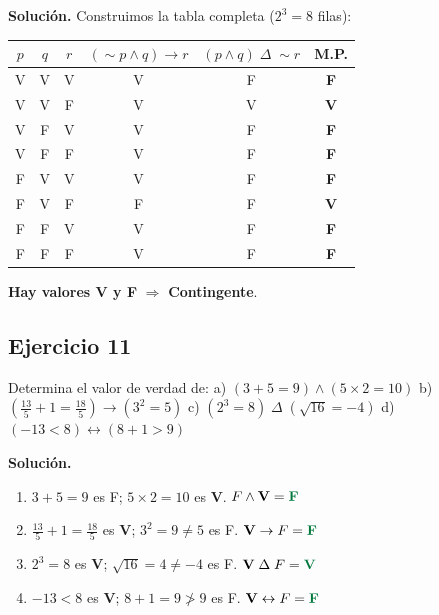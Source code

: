 \documentclass[12pt,a4paper]{article}
\newcommand{\V}{\textbf{V}}
\newcommand{\F}{F}
\newcommand{\resultado}[1]{\textcolor{verde}{\textbf{#1}}}
\begin{document}
\begin{solucion}
\textbf{Solución.} Construimos la tabla completa ($2^3 = 8$ filas):

\begin{center}
\small
\begin{tabular}{ccc|c|c|c}
\toprule
$p$ & $q$ & $r$ & $(\sim p \wedge q)\to r$ & $(p\wedge q)\;\Delta\;\sim r$ & \textbf{M.P.} \\
\midrule
V & V & V & V & F & \resultado{F} \\
V & V & F & V & V & \resultado{V} \\
V & F & V & V & F & \resultado{F} \\
V & F & F & V & F & \resultado{F} \\
F & V & V & V & F & \resultado{F} \\
F & V & F & F & F & \resultado{V} \\
F & F & V & V & F & \resultado{F} \\
F & F & F & V & F & \resultado{F} \\
\bottomrule
\end{tabular}
\end{center}

\textbf{Hay valores V y F} $\Rightarrow$ \resultado{Contingente}.
\end{solucion}

\bigskip

\subsection*{Ejercicio 11}

\begin{enunciado}
Determina el valor de verdad de:
a) $(3+5=9)\wedge(5\times2=10)$ \quad
b) $\left(\frac{13}{5}+1=\frac{18}{5}\right)\rightarrow(3^2=5)$ \quad
c) $(2^3=8)\;\Delta\;(\sqrt{16}=-4)$ \quad
d) $(-13<8)\leftrightarrow(8+1>9)$
\end{enunciado}

\begin{solucion}
\textbf{Solución.}

\begin{enumerate}[label=\alph*)]
  \item $3+5=9$ es \F; $5\times2=10$ es \V. \quad $\F \wedge \V = \resultado{F}$
  \item $\frac{13}{5}+1=\frac{18}{5}$ es \V; $3^2=9\neq5$ es \F. \quad $\V\rightarrow\F = \resultado{F}$
  \item $2^3=8$ es \V; $\sqrt{16}=4\neq-4$ es \F. \quad $\V\;\Delta\;\F = \resultado{V}$
  \item $-13<8$ es \V; $8+1=9\not>9$ es \F. \quad $\V\leftrightarrow\F = \resultado{F}$
\end{enumerate}
\end{solucion}
\end{document}
